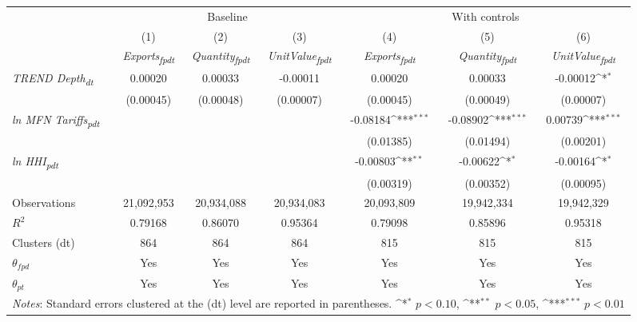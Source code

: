 {
\def\sym#1{\ifmmode^{#1}\else\(^{#1}\)\fi}
\begin{tabular}{l*{6}{c}}
\toprule
&\multicolumn{3}{c}{Baseline}&\multicolumn{3}{c}{With controls}\\\cmidrule(lr){2-4}\cmidrule(lr){5-7}
&(1)&(2)&(3)&(4)&(5)&(6)\\
&\textit{Exports\textsubscript{fpdt}}&\textit{Quantity\textsubscript{fpdt}}&\textit{UnitValue\textsubscript{fpdt}}&\textit{Exports\textsubscript{fpdt}}&\textit{Quantity\textsubscript{fpdt}}&\textit{UnitValue\textsubscript{fpdt}}\\
\midrule
\textit{TREND Depth\textsubscript{dt}} & 0.00020 & 0.00033 & -0.00011 & 0.00020 & 0.00033 & -0.00012\sym{*}\\
 & (0.00045) & (0.00048) & (0.00007) & (0.00045) & (0.00049) & (0.00007)\\
\addlinespace
\textit{ln MFN Tariffs\textsubscript{pdt}} &  &  &  & -0.08184\sym{***} & -0.08902\sym{***} & 0.00739\sym{***}\\
 &  &  &  & (0.01385) & (0.01494) & (0.00201)\\
\addlinespace
\textit{ln HHI\textsubscript{pdt}} &  &  &  & -0.00803\sym{**} & -0.00622\sym{*} & -0.00164\sym{*}\\
 &  &  &  & (0.00319) & (0.00352) & (0.00095)\\
\midrule
Observations & 21,092,953 & 20,934,088 & 20,934,083 & 20,093,809 & 19,942,334 & 19,942,329\\
$R^{2}$ & 0.79168 & 0.86070 & 0.95364 & 0.79098 & 0.85896 & 0.95318\\
Clusters (dt) & 864 & 864 & 864 & 815 & 815 & 815\\
$\theta_{fpd}$ & Yes & Yes & Yes & Yes & Yes & Yes\\
$\theta_{pt}$ & Yes & Yes & Yes & Yes & Yes & Yes\\
\bottomrule
\multicolumn{7}{l}{\footnotesize \textit{Notes}: Standard errors clustered at the (dt) level are reported in parentheses. \sym{*} \(p<0.10\), \sym{**} \(p<0.05\), \sym{***} \(p<0.01\)}\\
\end{tabular}
}
